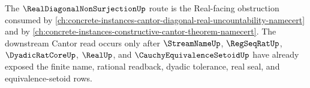 The $\RealDiagonalNonSurjectionUp$ route is the Real-facing obstruction consumed by \autoref{ch:concrete-instances-cantor-diagonal-real-uncountability-namecert} and by \autoref{ch:concrete-instances-constructive-cantor-theorem-namecert}. The downstream Cantor read occurs only after $\StreamNameUp$, $\RegSeqRatUp$, $\DyadicRatCoreUp$, $\RealUp$, and $\CauchyEquivalenceSetoidUp$ have already exposed the finite name, rational readback, dyadic tolerance, real seal, and equivalence-setoid rows.
